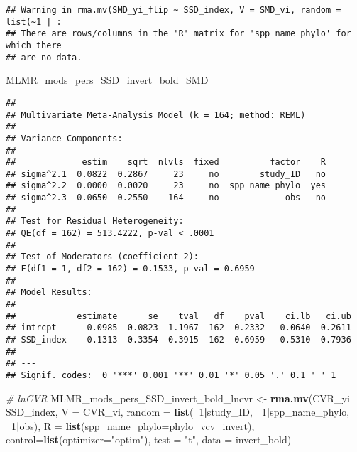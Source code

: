 \documentclass[]{article}
\newenvironment{Shaded}{\begin{snugshade}}{\end{snugshade}}
\newcommand{\KeywordTok}[1]{\textcolor[rgb]{0.13,0.29,0.53}{\textbf{#1}}}
\newcommand{\DataTypeTok}[1]{\textcolor[rgb]{0.13,0.29,0.53}{#1}}
\newcommand{\DecValTok}[1]{\textcolor[rgb]{0.00,0.00,0.81}{#1}}
\newcommand{\StringTok}[1]{\textcolor[rgb]{0.31,0.60,0.02}{#1}}
\newcommand{\CommentTok}[1]{\textcolor[rgb]{0.56,0.35,0.01}{\textit{#1}}}
\newcommand{\OperatorTok}[1]{\textcolor[rgb]{0.81,0.36,0.00}{\textbf{#1}}}
\newcommand{\NormalTok}[1]{#1}
\begin{document}
\begin{verbatim}
## Warning in rma.mv(SMD_yi_flip ~ SSD_index, V = SMD_vi, random = list(~1 | :
## There are rows/columns in the 'R' matrix for 'spp_name_phylo' for which there
## are no data.
\end{verbatim}

\begin{Shaded}
\begin{Highlighting}[]
\NormalTok{    MLMR_mods_pers_SSD_invert_bold_SMD}
\end{Highlighting}
\end{Shaded}

\begin{verbatim}
## 
## Multivariate Meta-Analysis Model (k = 164; method: REML)
## 
## Variance Components:
## 
##             estim    sqrt  nlvls  fixed          factor    R 
## sigma^2.1  0.0822  0.2867     23     no        study_ID   no 
## sigma^2.2  0.0000  0.0020     23     no  spp_name_phylo  yes 
## sigma^2.3  0.0650  0.2550    164     no             obs   no 
## 
## Test for Residual Heterogeneity:
## QE(df = 162) = 513.4222, p-val < .0001
## 
## Test of Moderators (coefficient 2):
## F(df1 = 1, df2 = 162) = 0.1533, p-val = 0.6959
## 
## Model Results:
## 
##            estimate      se    tval   df    pval    ci.lb   ci.ub 
## intrcpt      0.0985  0.0823  1.1967  162  0.2332  -0.0640  0.2611    
## SSD_index    0.1313  0.3354  0.3915  162  0.6959  -0.5310  0.7936    
## 
## ---
## Signif. codes:  0 '***' 0.001 '**' 0.01 '*' 0.05 '.' 0.1 ' ' 1
\end{verbatim}

\begin{Shaded}
\begin{Highlighting}[]
    \CommentTok{# lnCVR}
\NormalTok{      MLMR_mods_pers_SSD_invert_bold_lncvr <-}\StringTok{ }\KeywordTok{rma.mv}\NormalTok{(CVR_yi }\OperatorTok{~}\StringTok{ }\NormalTok{SSD_index, }\DataTypeTok{V =}\NormalTok{ CVR_vi, }
                                            \DataTypeTok{random =} \KeywordTok{list}\NormalTok{(}\OperatorTok{~}\DecValTok{1}\OperatorTok{|}\NormalTok{study_ID, }\OperatorTok{~}\DecValTok{1}\OperatorTok{|}\NormalTok{spp_name_phylo, }\OperatorTok{~}\DecValTok{1}\OperatorTok{|}\NormalTok{obs), }
                                            \DataTypeTok{R =} \KeywordTok{list}\NormalTok{(}\DataTypeTok{spp_name_phylo=}\NormalTok{phylo_vcv_invert), }\DataTypeTok{control=}\KeywordTok{list}\NormalTok{(}\DataTypeTok{optimizer=}\StringTok{"optim"}\NormalTok{), }
                                            \DataTypeTok{test =} \StringTok{"t"}\NormalTok{, }\DataTypeTok{data =}\NormalTok{ invert_bold)  }
\end{Highlighting}
\end{Shaded}
\end{document}
